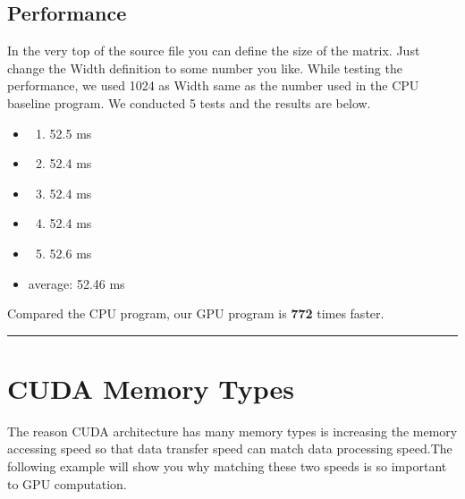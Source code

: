 \documentclass[letterpaper,10pt,openany,oneside]{sphinxmanual}
\begin{document}
\subsection{Performance}
\label{CUDA2D/CUDA2D:id1}
In the very top of the source file you can define the size of the matrix. Just change the Width definition to some number you like. While testing the performance, we used 1024 as Width same as the number used in the CPU baseline program. We conducted 5 tests and the results are below.
\begin{itemize}
\item {} \begin{enumerate}
\item {} 
52.5 ms

\end{enumerate}

\item {} \begin{enumerate}
\setcounter{enumi}{1}
\item {} 
52.4 ms

\end{enumerate}

\item {} \begin{enumerate}
\setcounter{enumi}{2}
\item {} 
52.4 ms

\end{enumerate}

\item {} \begin{enumerate}
\setcounter{enumi}{3}
\item {} 
52.4 ms

\end{enumerate}

\item {} \begin{enumerate}
\setcounter{enumi}{4}
\item {} 
52.6 ms

\end{enumerate}

\item {} 
average: 52.46 ms

\end{itemize}

Compared the CPU program, our GPU program is \textbf{772} times faster.


\bigskip\hrule{}\bigskip



\section{CUDA Memory Types}
\label{CUDA2D/CUDA2D:cuda-memory-types}
The reason CUDA architecture has many memory types is increasing the memory accessing speed so that data transfer speed can match data processing speed.The following example will show you why matching these two speeds is so important to GPU computation.
\end{document}

